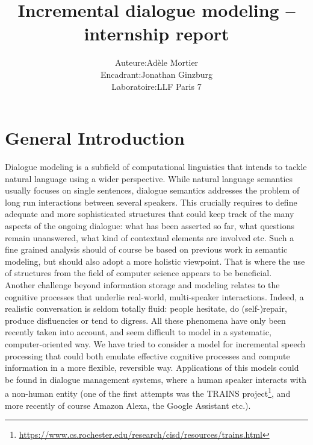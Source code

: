 \documentclass[11pt]{article}
\begin{document}
	\title{Incremental dialogue modeling -- internship report}
	\author{\begin{tabular}{rcl}
			Auteure &:& Adèle Mortier \\
			Encadrant &:& Jonathan Ginzburg\\
			Laboratoire &:& LLF Paris 7
		\end{tabular}
	}
	\maketitle
	
	

	\section*{General Introduction}
		Dialogue modeling is a subfield of computational linguistics that intends to tackle natural language using a wider perspective. While natural language semantics usually focuses on single sentences, dialogue semantics addresses the problem of long run interactions between several speakers. This crucially requires to define adequate and more sophisticated structures that could keep track of the many aspects of the ongoing dialogue: what has been asserted so far, what questions remain unanswered, what kind of contextual elements are involved etc. Such a fine grained analysis should of course be based on previous work in semantic modeling, but should also adopt a more holistic viewpoint. That is where the use of structures from the field of computer science appears to be beneficial.\\
		
		Another challenge beyond information storage and modeling relates to the cognitive processes that underlie real-world, multi-speaker interactions. Indeed, a realistic conversation is seldom totally fluid: people hesitate, do (self-)repair, produce disfluencies or tend to digress. All these phenomena have only been recently taken into account, and seem difficult to model in a systematic, computer-oriented way. We have tried to consider a model for incremental speech processing that could both emulate effective cognitive processes and compute information in a more flexible, reversible way. Applications of this models could be found in dialogue management systems, where a human speaker interacts with a non-human entity (one of the first attempts was the TRAINS project\footnote{\href{https://www.cs.rochester.edu/research/cisd/resources/trains.html}{https://www.cs.rochester.edu/research/cisd/resources/trains.html}}, and more recently of course Amazon Alexa, the Google Assistant etc.).
		
\end{document}

